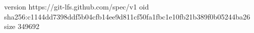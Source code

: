 version https://git-lfs.github.com/spec/v1
oid sha256:c1144dd7398ddf5b04cfb14ee9d811cf50fa1fbc1e10fb21b389f0b05244ba26
size 349692
